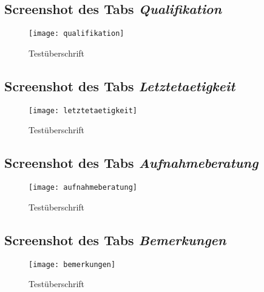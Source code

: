 \begin{landscape}
    \subsection{Screenshot des Tabs \textit{Qualifikation}}
    \label{section-qualifikation}
    \begin{figure}[H]
        \centering
        \caption{Testüberschrift}
        \begin{adjustbox}{width=\linewidth, center}
            \texttt{[image: qualifikation]}
        \end{adjustbox}
    \end{figure}

    \subsection{Screenshot des Tabs \textit{Letztetaetigkeit}}
    \label{section-letztetaetigkeit}
    \begin{figure}[H]
        \centering
        \caption{Testüberschrift}
        \begin{adjustbox}{width=\linewidth, center}
            \texttt{[image: letztetaetigkeit]}
        \end{adjustbox}
    \end{figure}

    \subsection{Screenshot des Tabs \textit{Aufnahmeberatung}}
    \label{section-aufnahmeberatung}
    \begin{figure}[H]
        \centering
        \caption{Testüberschrift}
        \begin{adjustbox}{width=\linewidth, center}
            \texttt{[image: aufnahmeberatung]}
        \end{adjustbox}
    \end{figure}

    \subsection{Screenshot des Tabs \textit{Bemerkungen}}
    \label{section-bemerkungen}
    \begin{figure}[H]
        \centering
        \caption{Testüberschrift}
        \begin{adjustbox}{width=\linewidth, center}
            \texttt{[image: bemerkungen]}
        \end{adjustbox}
    \end{figure}


\end{landscape}
